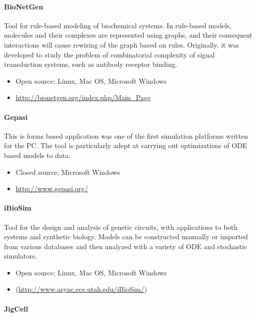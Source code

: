 \paragraph{BioNetGen \autocite{blinov2004bionetgen}}

Tool for rule-based modeling of biochemical systems. In rule-based
models, molecules and their complexes are represented using graphs, and
their consequent interactions will cause rewiring of the graph based on
rules. Originally, it was developed to study the problem of
combinatorial complexity of signal transduction systems, such as
antibody receptor binding.

\begin{itemize}
\item
  Open source; Linux, Mac OS, Microsoft Windows
\item
  \url{http://bionetgen.org/index.php/Main_Page}
\end{itemize}
\paragraph{Gepasi \autocite{Gepasi:1993}}

This is forms based application was one of the first simulation
platforms written for the PC. The tool is particularly adept at carrying
out optimizations of ODE based models to data.

\begin{itemize}
\item
  Closed source; Microsoft Windows
\item
  \url{http://www.gepasi.org/}
\end{itemize}
\paragraph{iBioSim \autocite{myers2009ibiosim}}

Tool for the design and analysis of genetic circuits, with applications
to both systems and synthetic biology. Models can be constructed
manually or imported from various databases and then analyzed with a
variety of ODE and stochastic simulators.

\begin{itemize}
\item
  Open source; Linux, Mac OS, Microsoft Windows
\item
  (\url{http://www.async.ece.utah.edu/iBioSim/})
\end{itemize}
\paragraph{JigCell \autocite{vass2004jigcell}
\autocite{vass2006jigcell}}

